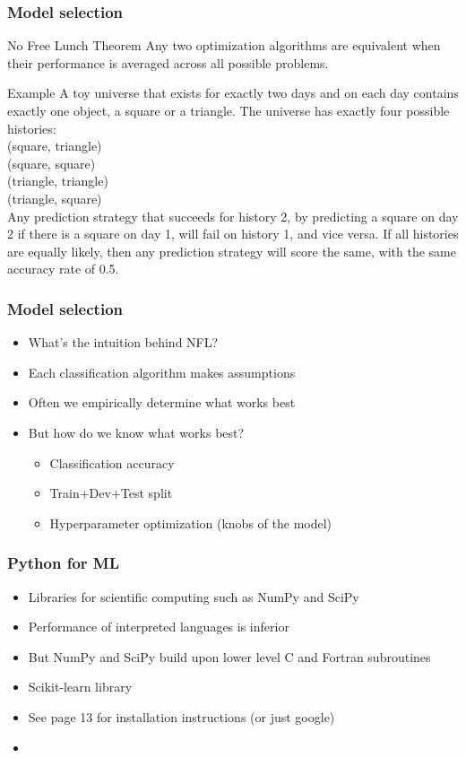 \documentclass{beamer}
\begin{document}
\begin{frame}
  \frametitle{Model selection}
  \begin{block}{No Free Lunch Theorem}
  Any two optimization algorithms are equivalent when their performance is averaged across all possible problems.
  \end{block}
  \begin{block}{Example}
  A toy universe that exists for exactly two days and on each day contains exactly one object, a square or a triangle.
  The universe has exactly four possible histories: \\
  (square, triangle) \\
  (square, square) \\
  (triangle, triangle) \\
  (triangle, square) \\
  Any prediction strategy that succeeds for history 2, by predicting a square on day 2 if there is a square on day 1, will fail on history 1, and vice versa. If all histories are equally likely, then any prediction strategy will score the same, with the same accuracy rate of 0.5.
  \end{block}
\end{frame}

\begin{frame}
  \frametitle{Model selection}
  \begin{itemize}
  \item What's the intuition behind NFL?
  \item Each classification algorithm makes assumptions
  \item Often we empirically determine what works best
  \item But how do we know what works best?
    \begin{itemize}
    \item Classification accuracy
    \item Train+Dev+Test split
    \item Hyperparameter optimization (knobs of the model)
    \end{itemize}
  \end{itemize}
\end{frame}

\begin{frame}
  \frametitle{Python for ML}
  \begin{itemize}
  \item Libraries for scientific computing such as NumPy and SciPy
  \item Performance of interpreted languages is inferior
  \item But NumPy and SciPy build upon lower level C and Fortran subroutines
  \item Scikit-learn library
  \item See page 13 for installation instructions (or just google)
  \item \href{http://jalammar.github.io/visual-numpy/}{}
  \end{itemize}
\end{frame}
\end{document}
